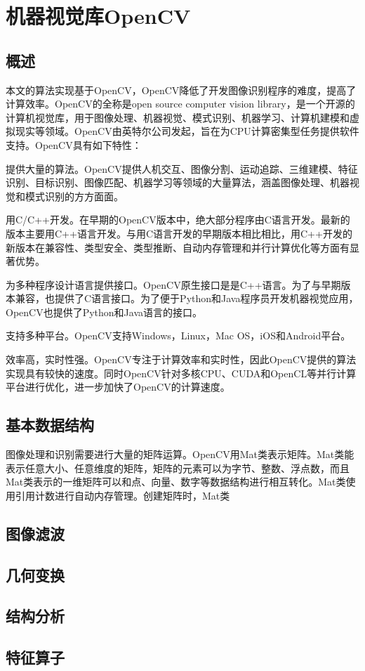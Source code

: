 
\chapter{机器视觉库OpenCV}

\section{概述}

本文的算法实现基于OpenCV，OpenCV降低了开发图像识别程序的难度，提高了计算效率。OpenCV的全称是open source computer vision library，是一个开源的计算机视觉库，用于图像处理、机器视觉、模式识别、机器学习、计算机建模和虚拟现实等领域。OpenCV由英特尔公司发起，旨在为CPU计算密集型任务提供软件支持。OpenCV具有如下特性：
\begin{asparaenum}[(1)]
\item 提供大量的算法。OpenCV提供人机交互、图像分割、运动追踪、三维建模、特征识别、目标识别、图像匹配、机器学习等领域的大量算法，涵盖图像处理、机器视觉和模式识别的方方面面。
\item 用C/C++开发。在早期的OpenCV版本中，绝大部分程序由C语言开发。最新的版本主要用C++语言开发。与用C语言开发的早期版本相比相比，用C++开发的新版本在兼容性、类型安全、类型推断、自动内存管理和并行计算优化等方面有显著优势。
\item   为多种程序设计语言提供接口。OpenCV原生接口是是C++语言。为了与早期版本兼容，也提供了C语言接口。为了便于Python和Java程序员开发机器视觉应用，OpenCV也提供了Python和Java语言的接口。
\item 支持多种平台。OpenCV支持Windows，Linux，Mac OS，iOS和Android平台。
\item 效率高，实时性强。OpenCV专注于计算效率和实时性，因此OpenCV提供的算法实现具有较快的速度。同时OpenCV针对多核CPU、CUDA和OpenCL等并行计算平台进行优化，进一步加快了OpenCV的计算速度。
\end{asparaenum}

\section{基本数据结构}

图像处理和识别需要进行大量的矩阵运算。OpenCV用Mat类表示矩阵。Mat类能表示任意大小、任意维度的矩阵，矩阵的元素可以为字节、整数、浮点数，而且Mat类表示的一维矩阵可以和点、向量、数字等数据结构进行相互转化。Mat类使用引用计数进行自动内存管理。创建矩阵时，Mat类


\section{图像滤波}

\section{几何变换}

\section{结构分析}

\section{特征算子}



